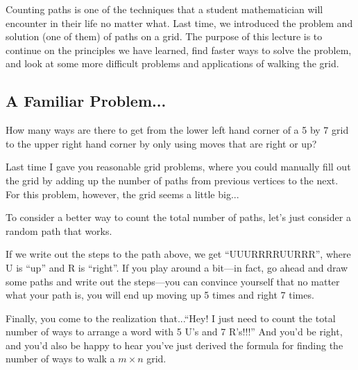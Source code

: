 	Counting paths is one of the techniques that a student mathematician will encounter in their life no matter what. Last time, we introduced the problem and solution (one of them) of paths on a grid. The purpose of this lecture is to continue on the principles we have learned, find faster ways to solve the problem, and look at some more difficult problems and applications of walking the grid.

	\subsection{A Familiar Problem...}
		 \begin{problem}
		 How many ways are there to get from the lower left hand corner of a 5 by 7 grid to the upper right hand corner by only using moves that are right or up?
		 \begin{center}
        \end{center}
		 \end{problem}
		Last time I gave you reasonable grid problems, where you could manually fill out the grid by adding up the number of paths from previous vertices to the next. For this problem, however, the grid seems a little big...
		
		To consider a better way to count the total number of paths, let's just consider a random path that works.
		
		\begin{center}
        \end{center}
		If we write out the steps to the path above, we get ``UUURRRRUURRR'', where U is ``up'' and R is ``right''. If you play around a bit---in fact, go ahead and draw some paths and write out the steps---you can convince yourself that no matter what your path is, you will end up moving up 5 times and right 7 times. 
		
		Finally, you come to the realization that...``Hey! I just need to count the total number of ways to arrange a word with 5 U's and 7 R's!!!'' And you'd be right, and you'd also be happy to hear you've just derived the formula for finding the number of ways to walk a $m\times n$ grid.
		

